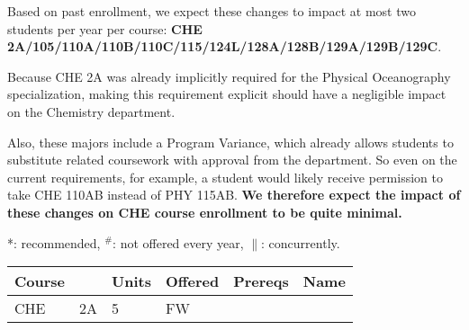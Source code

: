 \documentclass[12pt]{article}
\begin{document}
Based on past enrollment, we expect these changes to impact at most
two students per year per course: {\bf CHE
  2A/105/110A/110B/110C/115/124L/128A/128B/129A/129B/129C}.

Because CHE 2A was already implicitly required for the Physical
Oceanography specialization, making this requirement explicit should
have a negligible impact on the Chemistry department.

Also, these majors include a Program Variance, which
already allows students to substitute related coursework with approval
from the department.  So even on the current requirements, for
example, a student would likely receive permission to take CHE 110AB
instead of PHY 115AB.  {\bf We therefore expect the impact of these
  changes on CHE course enrollment to be quite minimal.}

\newpage
{}
\vskip 0.25cm
\noindent
*: recommended, $^\#$: not offered every year, $\parallel$: concurrently.\\
\begin{tabular}{|llllll|}
\hline
Course & & Units & Offered & Prereqs & Name \\
\hline
CHE  & 2A     & 5 & FW  & & \\
\hline
\end{tabular}\\
\end{document}
